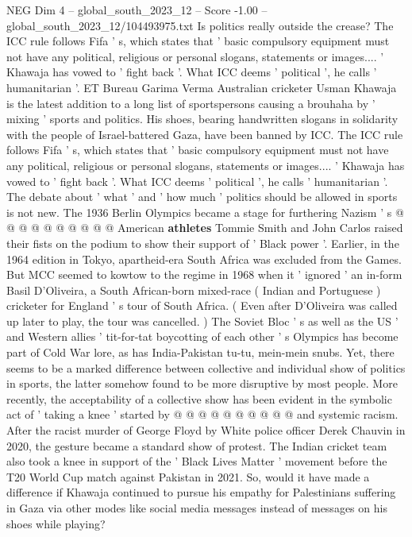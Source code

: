 \begin{textsample}{NEG Dim 4 – global\_south\_2023\_12 – Score -1.00 – global\_south\_2023\_12/104493975.txt}  \label{ex:f4_neg_313}
Is politics really outside the crease?
The ICC rule follows Fifa ' s, which states that ' basic compulsory equipment must not have any political, religious or personal slogans, statements or images.... ' Khawaja has vowed to ' fight back '.
What ICC deems ' political ', he calls ' humanitarian '.
ET Bureau Garima Verma Australian cricketer Usman Khawaja is the latest addition to a long list of sportspersons causing a brouhaha by ' mixing ' sports and politics.
His shoes, bearing handwritten slogans in solidarity with the people of Israel-battered Gaza, have been banned by ICC.
The ICC rule follows Fifa ' s, which states that ' basic compulsory equipment must not have any political, religious or personal slogans, statements or images.... ' Khawaja has vowed to ' fight back '.
What ICC deems ' political ', he calls ' humanitarian '.
The debate about ' what ' and ' how much ' politics should be allowed in sports is not new.
The 1936 Berlin Olympics became a stage for furthering Nazism ' s @ @ @ @ @ @ @ @ @ @ American \textbf{athletes} Tommie Smith and John Carlos raised their fists on the podium to show their support of ' Black power '.
Earlier, in the 1964 edition in Tokyo, apartheid-era South Africa was excluded from the Games.
But MCC seemed to kowtow to the regime in 1968 when it ' ignored ' an in-form Basil D'Oliveira, a South African-born mixed-race ( Indian and Portuguese ) cricketer for England ' s tour of South Africa. ( Even after D'Oliveira was called up later to play, the tour was cancelled. ) The Soviet Bloc ' s as well as the US ' and Western allies ' tit-for-tat boycotting of each other ' s Olympics has become part of Cold War lore, as has India-Pakistan tu-tu, mein-mein snubs.
Yet, there seems to be a marked difference between collective and individual show of politics in sports, the latter somehow found to be more disruptive by most people.
More recently, the acceptability of a collective show has been evident in the symbolic act of ' taking a knee ' started by @ @ @ @ @ @ @ @ @ @ and systemic racism.
After the racist murder of George Floyd by White police officer Derek Chauvin in 2020, the gesture became a standard show of protest.
The Indian cricket team also took a knee in support of the ' Black Lives Matter ' movement before the T20 World Cup match against Pakistan in 2021.
So, would it have made a difference if Khawaja continued to pursue his empathy for Palestinians suffering in Gaza via other modes like social media messages instead of messages on his shoes while playing?

\end{textsample}
